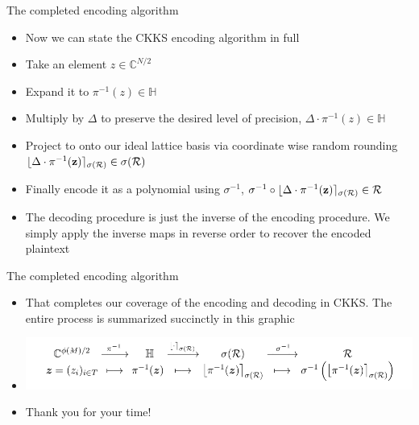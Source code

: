 \documentclass{beamer}
\begin{document}
\begin{frame}{The completed encoding algorithm}
	\begin{itemize}[<+->]
		\item Now we can state the CKKS encoding algorithm in full
		\item Take an element $z \in \mathbb{C}^{N/2}$
		\item Expand it to $\pi^{-1}(z) \in \mathbb{H}$
		\item Multiply by $\Delta$ to preserve the desired level of precision, $\Delta \cdot \pi^{-1}(z) \in \mathbb{H}$
		\item Project to onto our ideal lattice basis via coordinate wise random rounding $\lfloor \Delta \cdot \pi^{-1}({\bf z}) \rceil_{\sigma(\mathcal{R})} \in \sigma(\mathcal{R})$
		\item Finally encode it as a polynomial using $\sigma^{-1}$, $\sigma^{-1 } \circ \lfloor \Delta \cdot \pi^{-1}({\bf z}) \rceil_{\sigma(\mathcal{R})} \in \mathcal{R}$
		\item The decoding procedure is just the inverse of the encoding procedure. We simply apply the inverse maps in reverse order
		to recover the encoded plaintext
	\end{itemize}
\end{frame}

\begin{frame}{The completed encoding algorithm}
	\begin{itemize}[<+->]
		\item That completes our coverage of the encoding and decoding in CKKS. The entire process is summarized succinctly in this
		graphic
		\item \includegraphics[scale=0.35]{encoding_flow.png}
		\item Thank you for your time!
	\end{itemize}
\end{frame}
\end{document}

